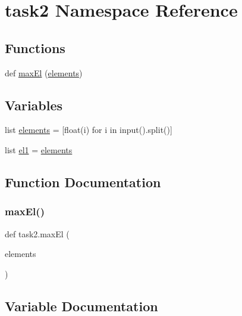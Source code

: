 \hypertarget{namespacetask2}{}\section{task2 Namespace Reference}
\label{namespacetask2}
\subsection*{Functions}
\begin{DoxyCompactItemize}
\item 
def \hyperlink{namespacetask2_a30935a4a3251e260dbb3d7616aedcde7}{max\+El} (\hyperlink{namespacetask2_aa48258fb49cab33676172ceb559d8c7d}{elements})
\end{DoxyCompactItemize}
\subsection*{Variables}
\begin{DoxyCompactItemize}
\item 
list \hyperlink{namespacetask2_aa48258fb49cab33676172ceb559d8c7d}{elements} = \mbox{[}float(i) for i in input().split()\mbox{]}
\item 
list \hyperlink{namespacetask2_a58c49ecdf633c20b06674a024dd752c2}{el1} = \hyperlink{namespacetask2_aa48258fb49cab33676172ceb559d8c7d}{elements}
\end{DoxyCompactItemize}


\subsection{Function Documentation}
\mbox{\label{namespacetask2_a30935a4a3251e260dbb3d7616aedcde7}} 
\subsubsection{\texorpdfstring{max\+El()}{maxEl()}}
{\footnotesize\ttfamily def task2.\+max\+El (\begin{DoxyParamCaption}\item[{}]{elements }\end{DoxyParamCaption})}



\subsection{Variable Documentation}
\mbox{\label{namespacetask2_a58c49ecdf633c20b06674a024dd752c2}} 
